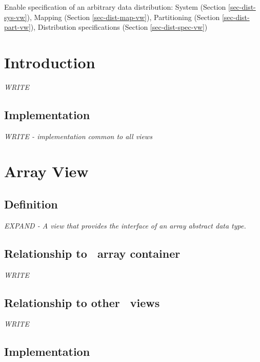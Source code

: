 Enable specification of an arbitrary data distribution:
\newline
System (Section \ref{sec-dist-sys-vw}),
Mapping (Section \ref{sec-dist-map-vw}),
Partitioning (Section \ref{sec-dist-part-vw}),
Distribution specifications (Section \ref{sec-dist-spec-vw})


\section{Introduction} \label{sec-intro-vw}

\textit{WRITE}

\subsection{Implementation}

\textit{WRITE - implementation common to all views}


\section{Array View} \label{sec-ary-vw}

\subsection{Definition}

\textit{EXPAND - A view that provides the interface of an array abstract data type.}

\subsection{Relationship to \stapl\ array container}

\textit{WRITE}

\subsection{Relationship to other \stapl\ views}

\textit{WRITE}

\subsection{Implementation}

